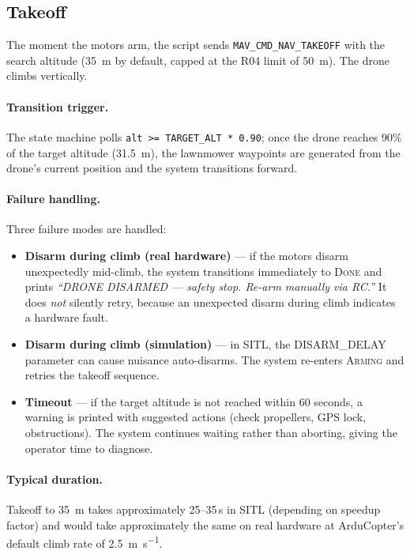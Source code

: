 \subsection{Takeoff}\label{sec:mf-takeoff}

The moment the motors arm, the script sends \texttt{MAV\_CMD\_NAV\_TAKEOFF} with the search altitude (\SI{35}{\metre} by default, capped at the R04 limit of \SI{50}{\metre}).  The drone climbs vertically.

\paragraph{Transition trigger.}  The state machine polls \texttt{alt >= TARGET\_ALT * 0.90}; once the drone reaches 90\% of the target altitude (\SI{31.5}{\metre}), the lawnmower waypoints are generated from the drone's current position and the system transitions forward.

\paragraph{Failure handling.}  Three failure modes are handled:
\begin{itemize}
  \item \textbf{Disarm during climb (real hardware)} --- if the motors disarm unexpectedly mid-climb, the system transitions immediately to \textsc{Done} and prints \textit{``DRONE DISARMED --- safety stop. Re-arm manually via RC.''}  It does \emph{not} silently retry, because an unexpected disarm during climb indicates a hardware fault.
  \item \textbf{Disarm during climb (simulation)} --- in SITL, the DISARM\_DELAY parameter can cause nuisance auto-disarms.  The system re-enters \textsc{Arming} and retries the takeoff sequence.
  \item \textbf{Timeout} --- if the target altitude is not reached within 60 seconds, a warning is printed with suggested actions (check propellers, GPS lock, obstructions).  The system continues waiting rather than aborting, giving the operator time to diagnose.
\end{itemize}

\paragraph{Typical duration.}  Takeoff to \SI{35}{\metre} takes approximately 25--35\,s in SITL (depending on speedup factor) and would take approximately the same on real hardware at ArduCopter's default climb rate of \SI{2.5}{\metre\per\second}.

